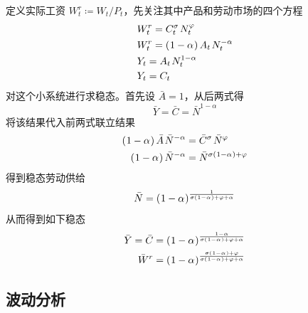 定义实际工资 \(W^r_t\coloneq W_t/P_t\)，先关注其中产品和劳动市场的四个方程
\begin{align}
    & W^r_t=C_t^\sigma\,N^\varphi_t \label{eq:CMM-equilibrium-1}\\
    & W^r_t=\bka{1-\alpha}A_t\,N^{-\alpha}_t\\
    & Y_t=A_t\,N^{1-\alpha}_t \\
    & Y_t=C_t \label{eq:CMM-equilibrium-4}
\end{align}
对这个小系统进行求稳态。首先设 \(\bar A=1\)，从后两式得
\begin{equation*}
    \bar Y=\bar C=\bar N^{1-\alpha}
\end{equation*}
将该结果代入前两式联立结果
\begin{align*}
    \bka{1-\alpha}\bar A\,\bar N^{-\alpha}&=\bar C^\sigma\,\bar N^{\varphi}\\
    \bka{1-\alpha}\bar N^{-\alpha}&=\bar N^{\sigma\bka{1-\alpha}+\varphi}
\end{align*}
得到稳态劳动供给
\begin{equation*}
    \bar N=\left(\mspace{1mu}1-\alpha\mspace{1mu}\right)^{\frac1{\sigma\left(\mspace{1mu}1-\alpha\mspace{1mu}\right)+\varphi+\alpha}}
\end{equation*}
从而得到如下稳态
\begin{align*}
    \bar Y=\bar C&=\left(\mspace{1mu}1-\alpha\mspace{1mu}\right)^{\frac{1-\alpha}{\sigma\left(\mspace{1mu}1-\alpha\mspace{1mu}\right)+\varphi+\alpha}}\\
    \bar W^r&=\left(\mspace{1mu}1-\alpha\mspace{1mu}\right)^{\frac{\sigma\left(\mspace{1mu}1-\alpha\mspace{1mu}\right)+\varphi}{\sigma\left(\mspace{1mu}1-\alpha\mspace{1mu}\right)+\varphi+\alpha}}
\end{align*}

\subsection{波动分析}



